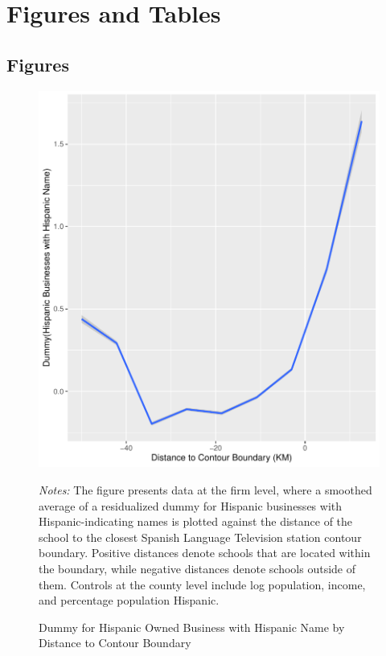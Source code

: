 \documentclass[11pt]{article}
\begin{document}
\clearpage
\pagebreak

\begin{singlespace}

%
{}
\end{singlespace}

\pagebreak
\clearpage

\section*{Figures and Tables}

\subsection{Figures}


\begin{figure}[!hbtp]
\centering
\caption{Dummy for Hispanic Owned Business with Hispanic Name by Distance to Contour Boundary }\label{busnnnamefig}
\includegraphics[width=12cm]{../../analysis/Output/graphs/hispanicbusnname.pdf}

\textit{Notes:} The figure presents data at the firm level, where a smoothed average of a residualized dummy for Hispanic businesses with Hispanic-indicating names is plotted against the distance of the school to the closest Spanish Language Television station contour boundary. Positive distances denote schools that are located within the boundary, while negative distances denote schools outside of them. Controls at the county level include log population, income, and percentage population Hispanic.
\end{figure} 
\end{document}
